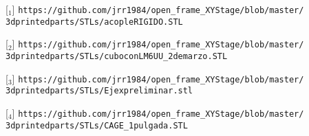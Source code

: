 [\href{https://github.com/jrr1984/open\_frame\_XYStage/blob/master/3dprintedparts/STLs/acopleRIGIDO.STL}{\faCubes$_{1}$}] \texttt{https://github.com/jrr1984/open\_frame\_XYStage/blob/master/\\\hspace{1.5cm}3dprintedparts/STLs/acopleRIGIDO.STL}

[\href{https://github.com/jrr1984/open\_frame\_XYStage/blob/master/3dprintedparts/STLs/cuboconLM6UU\_2demarzo.STL}{\faCubes$_{2}$}] \texttt{https://github.com/jrr1984/open\_frame\_XYStage/blob/master/\\\hspace{1.5cm}3dprintedparts/STLs/cuboconLM6UU\_2demarzo.STL}

[\href{https://github.com/jrr1984/open\_frame\_XYStage/blob/master/3dprintedparts/STLs/Ejexpreliminar.stl}{\faCubes$_{3}$}] \texttt{https://github.com/jrr1984/open\_frame\_XYStage/blob/master/\\\hspace{1.5cm}3dprintedparts/STLs/Ejexpreliminar.stl}

[\href{https://github.com/jrr1984/open\_frame\_XYStage/blob/master/3dprintedparts/STLs/CAGE\_1pulgada.STL}{\faCubes$_{4}$}] \texttt{https://github.com/jrr1984/open\_frame\_XYStage/blob/master/\\\hspace{1.5cm}3dprintedparts/STLs/CAGE\_1pulgada.STL}